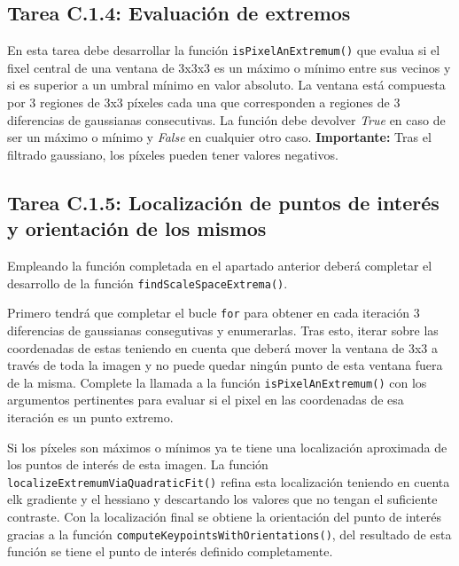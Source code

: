 \subsection*{Tarea C.1.4: Evaluación de extremos}

En esta tarea debe desarrollar la función \texttt{isPixelAnExtremum()} que evalua si el fixel central de una ventana de 3x3x3 es un máximo o mínimo entre sus vecinos y si es superior a un umbral mínimo en valor absoluto. La ventana está compuesta por 3 regiones de 3x3 píxeles cada una que corresponden a regiones de 3 diferencias de gaussianas consecutivas. La función debe devolver \textit{True} en caso de ser un máximo o mínimo y \textit{False} en cualquier otro caso. \textbf{Importante:} Tras el filtrado gaussiano, los píxeles pueden tener valores negativos.

\subsection*{Tarea C.1.5: Localización de puntos de interés y orientación de los mismos}

Empleando la función completada en el apartado anterior deberá completar el desarrollo de la función \texttt{findScaleSpaceExtrema()}.

Primero tendrá que completar el bucle \texttt{for} para obtener en cada iteración 3 diferencias de gaussianas consegutivas y enumerarlas. Tras esto, iterar sobre las coordenadas de estas teniendo en cuenta que deberá mover la ventana de 3x3 a través de toda la imagen y no puede quedar ningún punto de esta ventana fuera de la misma. Complete la llamada a la función \texttt{isPixelAnExtremum()} con los argumentos pertinentes para evaluar si el pixel en las coordenadas de esa iteración es un punto extremo.

Si los píxeles son máximos o mínimos ya te tiene una localización aproximada de los puntos de interés de esta imagen. La función \texttt{localizeExtremumViaQuadraticFit()} refina esta localización teniendo en cuenta elk gradiente y el hessiano y descartando los valores que no tengan el suficiente contraste. Con la localización final se obtiene la orientación del punto de interés gracias a la función \texttt{computeKeypointsWithOrientations()}, del resultado de esta función se tiene el punto de interés definido completamente.

